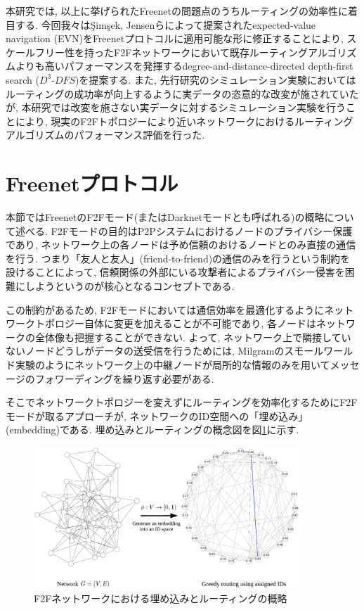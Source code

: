 \documentclass[technicalreport]{./ieicej-v3.0/UTF/ieicej}
\begin{document}
本研究では, 以上に挙げられたFreenetの問題点のうちルーティングの効率性に着目する. 今回我々は{\c{S}}im{\c{s}}ek, Jensenらによって提案されたexpected-value navigation (EVN)\cite{simsek2008navigating}をFreenetプロトコルに適用可能な形に修正することにより, スケールフリー性を持ったF2Fネットワークにおいて既存ルーティングアルゴリズムよりも高いパフォーマンスを発揮するdegree-and-distance-directed depth-first search ($D^3$-$DFS$)を提案する. また, 先行研究のシミュレーション実験においてはルーティングの成功率が向上するように実データの恣意的な改変が施されていたが, 本研究では改変を施さない実データに対するシミュレーション実験を行うことにより, 現実のF2Fトポロジーにより近いネットワークにおけるルーティングアルゴリズムのパフォーマンス評価を行った.


 \section{Freenetプロトコル} \label{sec:freenetprotocols}
  本節ではFreenetのF2Fモード(またはDarknetモードとも呼ばれる)の概略について述べる. F2Fモードの目的はP2Pシステムにおけるノードのプライバシー保護であり, ネットワーク上の各ノードは予め信頼のおけるノードとのみ直接の通信を行う. つまり「友人と友人」(friend-to-friend)の通信のみを行うという制約を設けることによって, 信頼関係の外部にいる攻撃者によるプライバシー侵害を困難にしようというのが核心となるコンセプトである.

   この制約があるため, F2Fモードにおいては通信効率を最適化するようにネットワークトポロジー自体に変更を加えることが不可能であり, 各ノードはネットワークの全体像も把握することができない. よって, ネットワーク上で隣接していないノードどうしがデータの送受信を行うためには, Milgramのスモールワールド実験\cite{milgram67smallworld}のようにネットワーク上の中継ノードが局所的な情報のみを用いてメッセージのフォワーディングを繰り返す必要がある. 

   そこでネットワークトポロジーを変えずにルーティングを効率化するためにF2Fモードが取るアプローチが, ネットワークのID空間への「埋め込み」(embedding)である. 埋め込みとルーティングの概念図を図\ref{fig:f2f_overview}に示す.

   \begin{figure}[htb]
    \centerline{\includegraphics[width=100mm]{../fig/greedy_embedding_overview.eps}}
    \caption{F2Fネットワークにおける埋め込みとルーティングの概略}
    \label{fig:f2f_overview}
   \end{figure}
\end{document}
